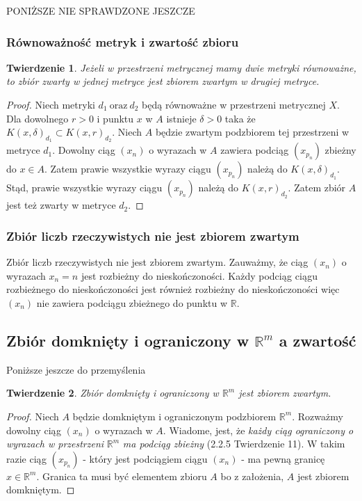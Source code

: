 \documentclass{article}
\newtheorem*{theorem}{Twierdzenie}
\begin{document}
\begin{center}
    PONIŻSZE NIE SPRAWDZONE JESZCZE
\end{center}
\subsubsection{Równoważność metryk i zwartość zbioru}
\begin{theorem}
    Jeżeli w przestrzeni metrycznej mamy dwie metryki równoważne, to zbiór zwarty w jednej metryce jest zbiorem zwartym w drugiej
    metryce.
\end{theorem}
\begin{proof}
    Niech metryki \(d_{1} \ \mbox{oraz} \ d_{2}\) będą równoważne w przestrzeni metrycznej \(X\).
    Dla dowolnego \(r > 0\) i punktu \(x\) w \(A\) istnieje \(\delta > 0\) taka że \(K(x, \delta)_{d_1} \subset K(x, r)_{d_2}\).
    Niech \(A\) będzie zwartym podzbiorem tej przestrzeni w metryce \(d_1\). Dowolny ciąg
    \((x_n)\) o wyrazach w \(A\) zawiera podciąg \((x_{p_n})\) zbieżny do \(x \in A\). Zatem prawie wszystkie wyrazy
    ciągu \((x_{p_n})\) należą do \(K(x, \delta)_{d_1}\). Stąd, prawie wszystkie wyrazy ciągu \((x_{p_n})\)
    należą do \(K(x, r)_{d_2}\). Zatem zbiór \(A\) jest też zwarty w metryce \(d_2\).
\end{proof}

\subsubsection{Zbiór liczb rzeczywistych nie jest zbiorem zwartym}
Zbiór liczb rzeczywistych nie jest zbiorem zwartym. Zauważmy, że ciąg \((x_n)\) o wyrazach \(x_n = n\) jest rozbieżny do
nieskończoności. Każdy podciąg ciągu rozbieżnego do nieskończoności jest również rozbieżny do nieskończoności więc \((x_n)\)
nie zawiera podciągu zbieżnego do punktu w \(\mathbb{R}\).

\subsection{Zbiór domknięty i ograniczony w \(\mathbb{R}^m\) a zwartość}
\begin{center}
    Poniższe jeszcze do przemyślenia
\end{center}
\begin{theorem}
    Zbiór domknięty i ograniczony w \(\mathbb{R}^m\) jest zbiorem zwartym.
\end{theorem}
\begin{proof}
    Niech \(A\) będzie domkniętym i ograniczonym podzbiorem \(\mathbb{R}^m\). 
    Rozważmy dowolny ciąg \((x_n)\) o wyrazach w \(A\). Wiadome, jest, że
    \emph{każdy ciąg ograniczony o wyrazach w przestrzeni} \(\mathbb{R}^m\) \emph{ma podciąg zbieżny} (2.2.5 Twierdzenie 11).
    W takim razie ciąg \((x_{p_n})\) - który jest podciągiem ciągu \((x_n)\) - ma pewną granicę \(x \in \mathbb{R}^m\).
    Granica ta musi być elementem zbioru \(A\) bo z założenia, \(A\) jest zbiorem domkniętym. 
\end{proof}
\end{document}
